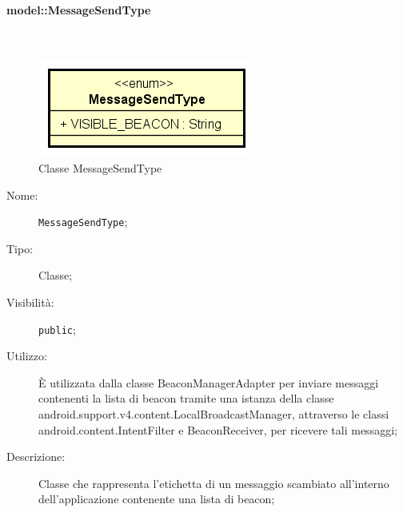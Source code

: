 \documentclass[../DefinizioneDiProdotto.tex]{subfiles}
\begin{document}
\paragraph{model::MessageSendType}
\
\begin{figure}[H]
	\centering
	\includegraphics[width=\maxwidth]{img/MessageSendType.png}
	\caption{Classe MessageSendType}\label{fig:model::MessageSendType} 
\end{figure}
\begin{description}
	\item[Nome:] \texttt{MessageSendType};
	\item[Tipo:] Classe;
	\item[Visibilità:] \texttt{public};
	\item[Utilizzo:] È utilizzata dalla classe BeaconManagerAdapter per inviare messaggi contenenti la lista di beacon tramite una istanza della classe android.support.v4.content.LocalBroadcastManager, attraverso le classi android.content.IntentFilter e BeaconReceiver, per ricevere tali messaggi;
	\item[Descrizione:] Classe che rappresenta l'etichetta di un messaggio scambiato all'interno dell'applicazione contenente una lista di beacon;
\end{description}
\end{document}
